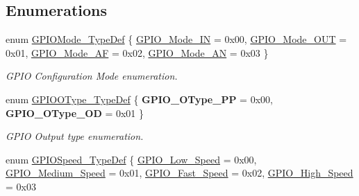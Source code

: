 \subsection*{Enumerations}
\begin{DoxyCompactItemize}
\item 
enum \mbox{\hyperlink{group___g_p_i_o_ga1347339e1c84a196fabbb31205eec5d4}{G\+P\+I\+O\+Mode\+\_\+\+Type\+Def}} \{ \mbox{\hyperlink{group___g_p_i_o_gga1347339e1c84a196fabbb31205eec5d4a484aa18a6156ce916049b334ba1839de}{G\+P\+I\+O\+\_\+\+Mode\+\_\+\+IN}} = 0x00, 
\mbox{\hyperlink{group___g_p_i_o_gga1347339e1c84a196fabbb31205eec5d4a60f1d530f4119efcad8e1a68c890c6a6}{G\+P\+I\+O\+\_\+\+Mode\+\_\+\+O\+UT}} = 0x01, 
\mbox{\hyperlink{group___g_p_i_o_gga1347339e1c84a196fabbb31205eec5d4a6d44c35c6c5008d85bac9251a867e701}{G\+P\+I\+O\+\_\+\+Mode\+\_\+\+AF}} = 0x02, 
\mbox{\hyperlink{group___g_p_i_o_gga1347339e1c84a196fabbb31205eec5d4a6e5c0d7e6d2e22b834b24e1ca1d6d0db}{G\+P\+I\+O\+\_\+\+Mode\+\_\+\+AN}} = 0x03
 \}
\begin{DoxyCompactList}\small\item\em G\+P\+IO Configuration Mode enumeration. \end{DoxyCompactList}\item 
\mbox{\label{group___g_p_i_o_gae74212e8d66c389f47326b06bdf6d2ab}} 
enum \mbox{\hyperlink{group___g_p_i_o_gae74212e8d66c389f47326b06bdf6d2ab}{G\+P\+I\+O\+O\+Type\+\_\+\+Type\+Def}} \{ {\bfseries G\+P\+I\+O\+\_\+\+O\+Type\+\_\+\+PP} = 0x00, 
{\bfseries G\+P\+I\+O\+\_\+\+O\+Type\+\_\+\+OD} = 0x01
 \}
\begin{DoxyCompactList}\small\item\em G\+P\+IO Output type enumeration. \end{DoxyCompactList}\item 
enum \mbox{\hyperlink{group___g_p_i_o_ga062ad92b67b4a1f301c161022cf3ba8e}{G\+P\+I\+O\+Speed\+\_\+\+Type\+Def}} \{ \mbox{\hyperlink{group___g_p_i_o_gga062ad92b67b4a1f301c161022cf3ba8ea898ec2036718768d42e79afcb95ce5bf}{G\+P\+I\+O\+\_\+\+Low\+\_\+\+Speed}} = 0x00, 
\mbox{\hyperlink{group___g_p_i_o_gga062ad92b67b4a1f301c161022cf3ba8eaeed9485cfebba319947e3ef495e44371}{G\+P\+I\+O\+\_\+\+Medium\+\_\+\+Speed}} = 0x01, 
\mbox{\hyperlink{group___g_p_i_o_gga062ad92b67b4a1f301c161022cf3ba8ea91731d092dedee851773cea4698662e6}{G\+P\+I\+O\+\_\+\+Fast\+\_\+\+Speed}} = 0x02, 
\mbox{\hyperlink{group___g_p_i_o_gga062ad92b67b4a1f301c161022cf3ba8ea5b6a7186d45e9daebfc03b7a309162e8}{G\+P\+I\+O\+\_\+\+High\+\_\+\+Speed}} = 0x03

\end{DoxyCompactItemize}
